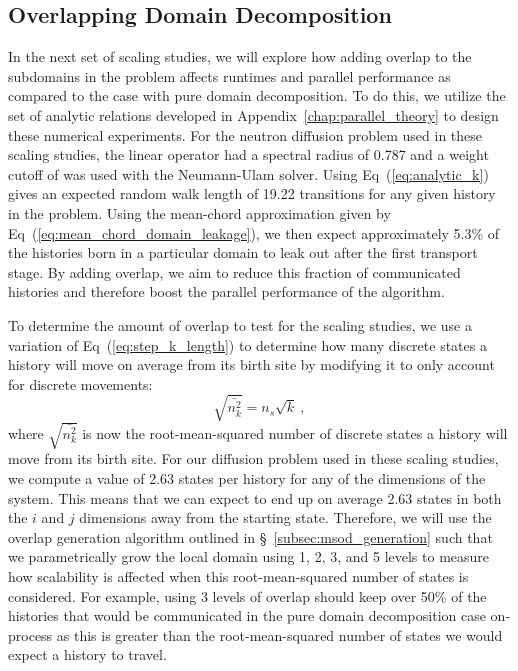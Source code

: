 \subsection{Overlapping Domain Decomposition}
\label{subsec:overlapping_domain_decomp}

In the next set of scaling studies, we will explore how adding overlap
to the subdomains in the problem affects runtimes and parallel
performance as compared to the case with pure domain decomposition. To
do this, we utilize the set of analytic relations developed in
Appendix~\ref{chap:parallel_theory} to design these numerical
experiments. For the neutron diffusion problem used in these scaling
studies, the linear operator had a spectral radius of 0.787 and a
weight cutoff of  was used with the Neumann-Ulam
solver. Using Eq~(\ref{eq:analytic_k}) gives an expected random walk
length of 19.22 transitions for any given history in the
problem. Using the mean-chord approximation given by
Eq~(\ref{eq:mean_chord_domain_leakage}), we then expect approximately
5.3\% of the histories born in a particular domain to leak out after
the first transport stage. By adding overlap, we aim to reduce this
fraction of communicated histories and therefore boost the parallel
performance of the algorithm.

To determine the amount of overlap to test for the scaling studies, we
use a variation of Eq~(\ref{eq:step_k_length}) to determine how many
discrete states a history will move on average from its birth site by
modifying it to only account for discrete movements:
\begin{equation}
  \sqrt{\bar{n^2_k}} = n_s \sqrt{k}\:,
  \label{eq:discrete_distance}
\end{equation}
where $\sqrt{\bar{n^2_k}}$ is now the root-mean-squared number of
discrete states a history will move from its birth site. For our
diffusion problem used in these scaling studies, we compute a value of
2.63 states per history for any of the dimensions of the system. This
means that we can expect to end up on average 2.63 states in both the
$i$ and $j$ dimensions away from the starting state. Therefore, we
will use the overlap generation algorithm outlined in
\S~\ref{subsec:msod_generation} such that we parametrically grow the
local domain using 1, 2, 3, and 5 levels to measure how scalability is
affected when this root-mean-squared number of states is
considered. For example, using 3 levels of overlap should keep over
50\% of the histories that would be communicated in the pure domain
decomposition case on-process as this is greater than the
root-mean-squared number of states we would expect a history to
travel.

